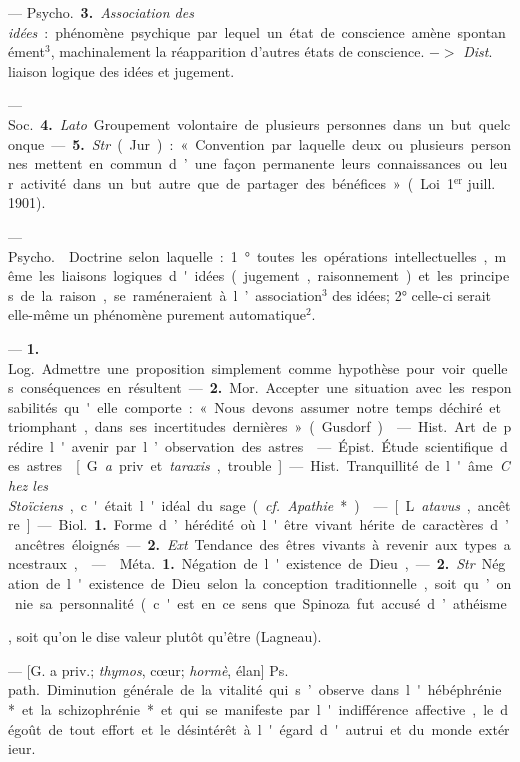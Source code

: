 \begin{itemize}[leftmargin=1cm, label=, itemsep=1pt]
{{{{— \si{Psycho.} {\bf 3.} {\it Association des
idées} : phénomène psychique par
lequel un état de conscience amène
spontanément$^3$, machinalement la
réapparition d’autres états de conscience. $->$ {\it Dist}. liaison logique
des idées et jugement.

— \si{Soc.} {\bf 4.} {\it Lato}. Groupement
volontaire de plusieurs personnes
dans un but quelconque. — {\bf 5.} {\it Str}.
(Jur.) : « Convention par laquelle
deux ou plusieurs personnes mettent
en commun d’une façon permanente
leurs connaissances ou leur activité
dans un but autre que de partager
des bénéfices ». (Loi 1$^\text{er}$ juill. 1901).

 — \si{Psycho.}  Doctrine selon laquelle : 1° toutes les
opérations intellectuelles, même les
liaisons logiques d'idées (jugement,
raisonnement) et les principes de la
raison, se raméneraient à l’association$^3$ des idées; 2° celle-ci serait
elle-même un phénomène purement
automatique$^2$.

 — {\bf 1.} \si{Log.} Admettre une
proposition simplement comme hypothèse pour voir quelles
conséquences en résultent.

— {\bf 2.} \si{Mor.} Accepter une situation avec les responsabilités qu'elle
comporte : « Nous devons assumer
notre temps déchiré et triomphant,
dans ses incertitudes dernières »
(Gusdorf).

 — \si{Hist.} Art de prédire
l'avenir par l’observation des astres.

 — \si{Épist.} Étude scientifique des astres.

 [G. {\it a} priv. et {\it taraxis}, trouble]. — \si{Hist.} Tranquillité de l'âme.
{\it Chez les Stoïciens}, c'était l'idéal du
sage ({\it cf.}  {\it Apathie}*).

 — [L. {\it atavus}, ancêtre] —
\si{Biol.} {\bf 1.} Forme d’hérédité où l'être
vivant hérite de caractères d’ancêtres éloignés. — {\bf 2.} {\it Ext}. Tendance
des êtres vivants à revenir aux types
ancestraux,

 —  \si{Méta.} {\bf 1.} Négation de
l'existence de Dieu, — {\bf 2.} {\it Str}. Négation de l'existence de Dieu selon la
conception traditionnelle, soit qu’on
nie sa personnalité (c'est en ce sens
que Spinoza fut accusé d’athéisme},
soit qu’on le dise valeur plutôt
qu'être (Lagneau).

 — [G. a priv.; {\it thymos}, cœur; {\it hormè}, élan]
\si{Ps. path.} Diminution générale de la vitalité qui s’observe dans
l'hébéphrénie* et la schizophrénie* et qui se manifeste par l'indifférence
affective, le dégoût de tout effort et le désintérêt à l'égard d'autrui et du
monde extérieur.

}}}
\end{itemize}
